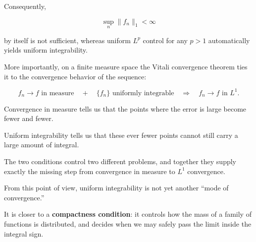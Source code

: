 \documentclass[11pt]{article}
\begin{document}
Consequently,

\[
\sup_n\|f_n\|_1<\infty
\]

by itself is not sufficient, whereas uniform $L^p$ control for any $p>1$ automatically yields uniform integrability.

More importantly, on a finite measure space the Vitali convergence theorem ties it to the convergence behavior of the sequence:

\[
\boxed{
f_n\to f\text{ in measure}
\quad+\quad
\{f_n\}\text{ uniformly integrable}
\quad\Longrightarrow\quad
f_n\to f\text{ in }L^1.
}
\]

Convergence in measure tells us that the points where the error is large become fewer and fewer.

Uniform integrability tells us that these ever fewer points cannot still carry a large amount of integral.

The two conditions control two different problems, and together they supply exactly the missing step from convergence in measure to $L^1$ convergence.

From this point of view, uniform integrability is not yet another ``mode of convergence.''

It is closer to a \textbf{compactness condition}: it controls how the mass of a family of functions is distributed, and decides when we may safely pass the limit inside the integral sign.
\end{document}
